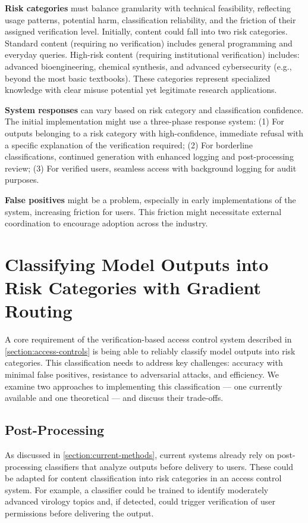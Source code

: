 \documentclass{article}
\theoremstyle{plain}
\theoremstyle{definition}
\theoremstyle{remark}
\begin{document}
\textbf{Risk categories} must balance granularity with technical
feasibility, reflecting usage patterns, potential harm,
classification reliability, and the friction of their assigned
verification level. Initially, content could fall into two risk
categories. Standard content (requiring no verification) includes
general programming and everyday queries. High-risk content
(requiring institutional verification) includes: advanced
bioengineering, chemical synthesis, and advanced cybersecurity (e.g.,
beyond the most basic textbooks). These categories represent
specialized knowledge with clear misuse potential yet legitimate
research applications.

\textbf{System responses} can vary based on risk category and
classification confidence.
The initial implementation might use a three-phase response system:
(1) For outputs belonging to a risk category with high-confidence,
immediate refusal with a specific explanation of the verification
required; (2) For borderline classifications, continued generation
with enhanced logging and post-processing review; (3) For verified
users, seamless access with background logging for audit purposes.

\textbf{False positives} might be a problem, especially in early
implementations of the system, increasing friction for users. This
friction might necessitate external coordination to encourage
adoption across the industry.

\section{Classifying Model Outputs into Risk Categories with Gradient
Routing} \label{section:risk-classification}

A core requirement of the verification-based access control system
described in \cref{section:access-controls} is being able to reliably
classify model outputs into risk categories.
This classification needs to address key challenges: accuracy with
minimal false positives, resistance to adversarial attacks, and efficiency.
We examine two approaches to implementing this classification --- one
currently available and one theoretical --- and discuss their trade-offs.

\subsection{Post-Processing}

As discussed in \cref{section:current-methods}, current systems
already rely on post-processing classifiers that analyze outputs
before delivery to users.
These could be adapted for content classification into risk
categories in an access control system.
For example, a classifier could be trained to identify moderately
advanced virology topics and, if detected, could trigger verification
of user permissions before delivering the output.
\end{document}
